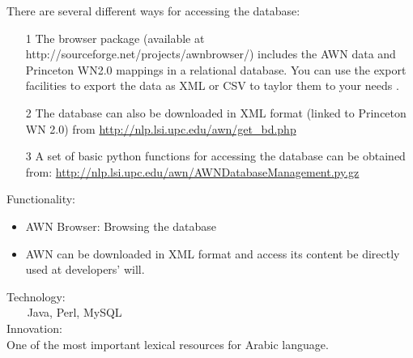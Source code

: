 There are several different ways for accessing the database:\\
\begin{itemize}
\item[1] The browser package (available at http://sourceforge.net/projects/awnbrowser/) includes the AWN data and Princeton WN2.0 mappings in a relational database. You can use the export facilities to export the data as XML or CSV to taylor them to your needs .\\
\item[2] The database can also be downloaded in XML format (linked to Princeton WN 2.0) from \url {http://nlp.lsi.upc.edu/awn/get_bd.php}\\
\item[3] A set of basic python functions for accessing the database can be obtained from: \url {http://nlp.lsi.upc.edu/awn/AWNDatabaseManagement.py.gz}\\
\end{itemize}
Functionality:\\
\begin{itemize}
\item AWN Browser: Browsing the database\\
\item AWN can be downloaded in XML format and access its content be directly used at developers' will.\\
\end{itemize}
Technology:\\
    Java, Perl, MySQL\\
Innovation:\\
	One of the most important lexical resources for Arabic language.\\




